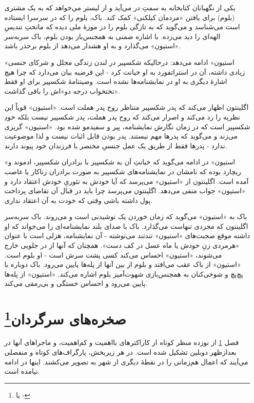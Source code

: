 \documentclass[12pt]{book}
\newcommand{\noun}[1]{«{#1}»}
\begin{document}
    یکی از نگهبانان کتابخانه به سمتِ در می‌آید و از لیستر می‌خواهد که به یک مشتری (بلوم) برای یافتن  «مردمان کیلکنی» کمک کند. باک، بلوم را که در سرسرا ایستاده است می‌شناسد و می‌گوید که به تازگی بلوم را در موزۀ ملی دیده که ماتحتِ تندیسِ الهه‌ای را دید می‌زده. با اشاره ضمنی به همجنس‌باز بودن بلوم، باک سربه‌سر \noun{استیون} می‌گذارد و به او هشدار می‌دهد از بلوم برحذر باشد.

    \noun{استیون} ادامه می‌دهد: درحالیکه شکسپیر در لندن زندگی مجلل و شرکای جنسی زیادی داشته، آن در استراتفورد به او خیانت کرد - این فرضیه بیان می‌دارد که چرا هیچ اشارۀ دیگری به او در نمایشنامه‌ها نشده است. وصیتنامۀ شکسپیر برای او فقط «تختخواب درجه دو»اش را باقی گذاشت.

    اگلینتون اظهار می‌کند که پدر شکسپیر متناظر روح پدر هملت است. \noun{استیون} قویاً این نظریه را رد می‌کند و اصرار می‌کند که روح پدر هملت، پدر شکسپیر نیست بلکه خودِ شکسپیر است که در زمان نگارش نمایشنامه، پیر و سفیدمو شده بود. \noun{استیون} گریزی می‌زند و می‌گوید که پدرها مهم نیستند. پدر بودن قابل اثبات نیست و لذا موضوعیت ندارد - پدرها فقط از طریق یک عمل جنسیِ مختصر با فرزندان خود پیوند دارند.

    \noun{استیون} در ادامه می‌گوید که خیانتِ آن به شکسپیر با برادران شکسپیر، ادموند و ریچارد بوده که نامشان در نمایشنامه‌های شکسپیر به صورت برادران زناکار یا غاصب آمده است. اگلینتون از \noun{استیون} می‌پرسد که آیا خودش به تئوریِ خودش اعتقاد دارد و \noun{استیون} جواب منفی می‌دهد. اگلینتون می‌پرسد چرا باید در قبال آن تقاضای پرداخت پول داشته باشی وقتی که خودت به آن اعتقاد نداری.

    باک به \noun{استیون} می‌گوید که زمان خوردن یک نوشیدنی است و می‌روند. باک سربه‌سر اگلینتون که مجردی تنهاست می‌گذارد. باک با صدای بلند نمایشنامه‌ای را می‌خواند که او داشته موقع صحبت‌های \noun{استیون} تندتند می‌نوشته - آن نمایشنامه، هزلی است با عنوان «هرمردی زنِ خودش یا ماه عسل در کف دست». همچنان که آنها از در جلویی خارج  می‌شوند، \noun{استیون} احساس می‌کند کسی پشت سرش است - او بلوم است. \noun{استیون} از باک عقب می‌افتد و بلوم از بین آنها از پله‌ها پایین می‌رود. باک دوباره با پچ‌پچ و شوخی‌کنان به همجنس‌بازی شهوت‌آمیز بلوم اشاره می‌کند. \noun{استیون} از پله‌ها پایین می‌رود و احساس خستگی و بی‌رمقی می‌کند.

    \chapter[صخره‌های سرگردان]{صخره‌های سرگردان\protect\footnote{ یا -}}\label{ep:10}
    فصل \ref{ep:10} از نوزده منظر کوتاه از کاراکترهای بااهمیت و کم‌اهمیت، و ماجراهای آنها در بعدازظهر دوبلین تشکیل شده است. در هر زیربخش، پارگراف‌های کوتاه و منفصلی می‌آیند که اعمال هم‌زمانی را در نقطۀ دیگری از شهر به تصویر می‌کشند. اینها در ادامه نیامده است.
\end{document}
